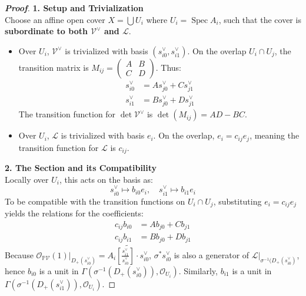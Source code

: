 \begin{proof}[\textbf{Proof}]
    \textbf{1. Setup and Trivialization} \\
Choose an affine open cover $X = \bigcup U_i$ where $U_i = \operatorname{Spec} A_i$, such that the cover is \textbf{subordinate to both $\mathcal{V}^\vee$ and $\mathcal{L}$}. 
\begin{itemize}
    \item Over $U_i$, $\mathcal{V}^\vee$ is trivialized with basis $(s_{i0}^\vee, s_{i1}^\vee)$. On the overlap $U_i \cap U_j$, the transition matrix is $M_{ij} = \begin{pmatrix} A & B \\ C & D \end{pmatrix}$. Thus:
    \begin{align*}
    s_{i0}^\vee &= A s_{j0}^\vee + C s_{j1}^\vee \\
    s_{i1}^\vee &= B s_{j0}^\vee + D s_{j1}^\vee
    \end{align*}
    The transition function for $\det \mathcal{V}^\vee$ is $\det(M_{ij}) = AD - BC$.
    \item Over $U_i$, $\mathcal{L}$ is trivialized with basis $e_i$. On the overlap, $e_i = c_{ij} e_j$, meaning the transition function for $\mathcal{L}$ is $c_{ij}$.
\end{itemize}


\textbf{2. The Section and its Compatibility} \\
Locally over $U_i$, this acts on the basis as:
\[
s_{i0}^\vee \mapsto b_{i0} e_i, \quad s_{i1}^\vee \mapsto b_{i1} e_i
\]
To be compatible with the transition functions on $U_i \cap U_j$, substituting $e_i = c_{ij}e_j$ yields the relations for the coefficients:
\begin{align*}
c_{ij} b_{i0} &= A b_{j0} + C b_{j1} \\
c_{ij} b_{i1} &= B b_{j0} + D b_{j1}
\end{align*}
Because $\mathcal{O}_{\mathbb{P}\mathcal{V}}(1)|_{D_+(s_{i0}^\vee)} = \widetilde{A_i\left[\frac{s_{i1}^{\vee}}{s_{i0}^\vee}\right]\cdot s_{i0}^\vee}$,
$\sigma^* s_{i0}^{\vee}$ is also a generator of $\mathcal{L}|_{\sigma^{-1}(D_+(s_{i0}^\vee)}$,
hence $b_{i0}$ is a unit in $\Gamma(\sigma^{-1}(D_+(s_{i0}^\vee)), \mathcal{O}_{U_i})$.
Similarly, $b_{i1}$ is a unit in $\Gamma(\sigma^{-1}(D_+(s_{i1}^\vee)), \mathcal{O}_{U_i})$.



\end{proof}
